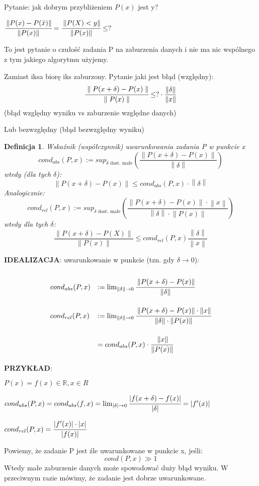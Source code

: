 \documentclass[hidelinks,a4paper,fleqn,oneside]{book}
\newcommand{\RR}{\mathbb{R}}
\newcommand{\ra}{\rightarrow}
\newcommand{\norm}[1]{\left\lVert#1\right\rVert}
\newtheorem{defi}{Definicja}
\begin{document}
Pytanie: jak dobrym przybliżeniem $P(x)$ jest y? 

$\cfrac{\norm{P(x) - P(\tilde{x})}}{\norm{P(x)}} = \cfrac{\norm{P(X) < y}}{\norm{P(x)}} \leq ?$

To jest pytanie o czułość zadania P na zaburzenia danych i nie ma nic wspólnego z tym jakiego algorytmu użyjemy.


Zamiast iksa biorę iks zaburzony. Pytanie jaki jest błąd (względny):
\[
	\cfrac{\parallel P(x + \delta) - P(x) \parallel}{\parallel P(x) \parallel} \leq ? \cdot \frac{\norm{\delta}}{\norm{x}}
\]
(błąd względny wyniku vs zaburzenie względne danych)

Lub bezwzględny (błąd bezwzględny wyniku)


\begin{defi}
	Wskaźnik (współczynnik) uwarunkowania zadania P w punkcie x
	\[
		cond_{abs}(P, x) := sup_{\delta\textrm{ dost. małe}}\left(\frac{\norm{P(x + \delta) - P(x)}}{\norm{\delta}}\right)
	\]
	wtedy (dla tych $\delta$):
	\[
		\norm{P(x + \delta) - P(x)} \leq cond_{abs} (P, x) \cdot \norm{\delta}
	\]
	Analogicznie:
	\[
		cond_{rel}(P, x) := sup_{\delta\textrm{ dost. małe}}\left(\frac{\norm{P(x + \delta) - P(x)} \cdot \norm{x}}{\norm{\delta} \cdot \norm{P(x)}}\right)
	\]
	wtedy dla tych $\delta$:
	\[
		\frac{\norm{P(x + \delta) - P(X)}}{\norm{P(x)}} \leq cond_{rel} (P, x) \frac{\norm{\delta}}{\norm{x}}
	\]
	
\end{defi}

\textbf{IDEALIZACJA}: uwarunkowanie w punkcie (tzn. gdy $\delta \ra 0$):
\[\def\arraystretch{3.4}
	\begin{array}{ll}
		cond_{abs}(P, x) & := \lim_{\norm{\delta} \ra 0} \cfrac{\norm{P(x + \delta) - P(x)}}{\norm{\delta}} \\
		cond_{rel}(P, x) & := \lim_{\norm{\delta} \ra 0} \cfrac{\norm{P(x + \delta) - P(x)} \cdot \norm{x}}{\norm{\delta} \cdot \norm{P(x)}} \\ & = cond_{abs} (P, x) \cdot \cfrac{\norm{x}}{\norm{P(x)}}
	\end{array}
\]

\textbf{PRZYKŁAD}:

$P(x) = f(x) \in \RR, x \in R$

$cond_{abs} (P, x) = cond_{abs}(f, x) = \lim_{| \delta | \ra 0} \cfrac{| f(x + \delta) - f(x)|}{| \delta |} = |f'(x)|$

$cond_{rel}(P, x) = \cfrac{|f'(x)| \cdot |x|}{|f(x)|}$

Powiemy, że zadanie P jest źle uwarunkowane w punkcie x, jeśli:
\[
	cond(P, x) \gg 1
\]
Wtedy małe zaburzenie danych może spowodować duży błąd wyniku. W przeciwnym razie mówimy, że zadanie jest dobrze uwarunkowane.
\end{document}
